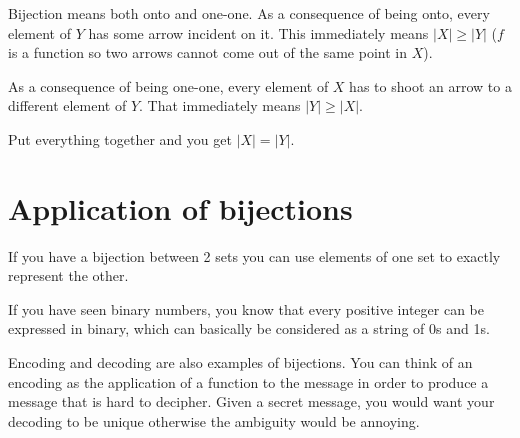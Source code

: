\documentclass[12pt]{article}
\begin{document}
Bijection means both onto and one-one. As a consequence of being onto, every element of $Y$ has some arrow incident on it. This immediately means $|X| \ge |Y|$ ($f$ is a function so two arrows cannot come out of the same point in $X$).

As a consequence of being one-one, every element of $X$ has to shoot an arrow to a different element of $Y$. That immediately means $|Y| \ge |X|$. 

Put everything together and you get $|X| = |Y|$.

\section*{Application of bijections}

If you have a bijection between 2 sets you can use elements of one set to exactly represent the other.

If you have seen binary numbers, you know that every positive integer can be expressed in binary, which can basically be considered as a string of 0s and 1s. 

Encoding and decoding are also examples of bijections. You can think of an encoding as the application of a function to the message in order to produce a message that is hard to decipher. Given a secret message, you would want your decoding to be unique otherwise the ambiguity would be annoying.
\end{document}
